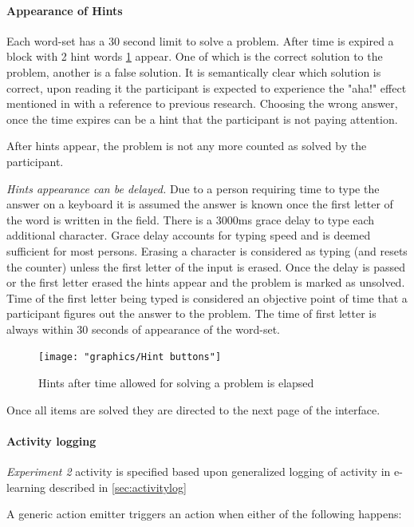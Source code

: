 		\paragraph{Appearance of Hints}
		
		Each word-set has a 30 second limit to solve a problem. After time is expired a block with 2 hint words \ref{fig:hint-buttons} appear. One of which is the correct solution to the problem, another is a false solution. It is semantically clear which solution is correct, upon reading it the participant is expected to experience the "aha!" effect mentioned in \cite[p.634]{Bowden} with a reference to previous research. Choosing the wrong answer, once the time expires can be a hint that the participant is not paying attention.
		
		After hints appear, the problem is not any more counted as solved by the participant. 
		
		\textit{Hints appearance can be delayed.} Due to a person requiring time to type the answer on a keyboard it is assumed the answer is known once the first letter of the word is written in the field. There is a 3000ms grace delay to type each additional character. Grace delay accounts for typing speed and is deemed sufficient for most persons. Erasing a character is considered as typing (and resets the counter) unless the first letter of the input is erased. Once the delay is passed or the first letter erased the hints appear and the problem is marked as unsolved. Time of the first letter being typed is considered an objective point of time that a participant figures out the answer to the problem. The time of first letter is always within 30 seconds of appearance of the word-set.
		
		\begin{figure}
			\centering
			\texttt{[image: "graphics/Hint buttons"]}
			\caption{Hints after time allowed for solving a problem is elapsed}
			\label{fig:hint-buttons}
		\end{figure}
		
		
		Once all items are solved they are directed to the next page of the interface.
				
		\paragraph{Activity logging} \textit{Experiment 2} activity is specified based upon generalized logging of activity in e-learning described in \ref{sec:activitylog}
		
		A generic action emitter triggers an action when either of the following happens:
		
